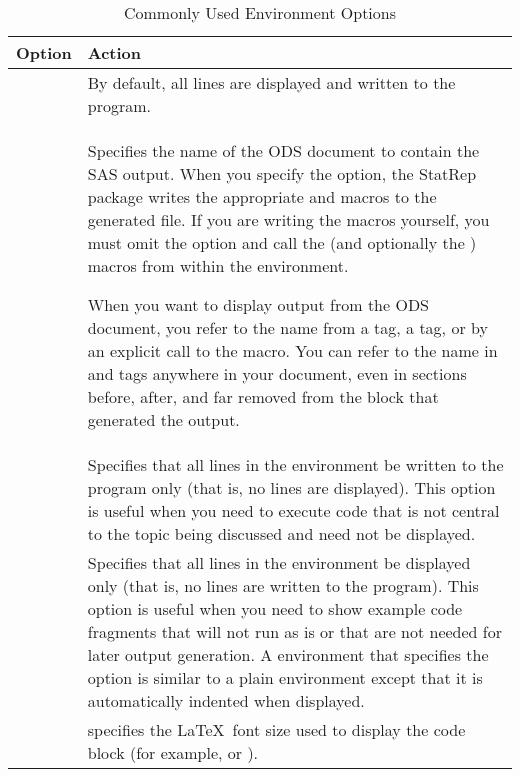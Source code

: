 \documentclass[article,oneside]{memoir}
\newcommand*{\StatRep}{\textsf{StatRep}\xspace}
\begin{document}
\begin{table}[H]
\caption{Commonly Used  Environment Options}\label{scopt}
\begin{tabular}{lP{3.75in}}
\hline
\textbf{Option}  &  \textbf{Action} \\
\hline
& By default, all lines are displayed and written to the program. \\[0.5\baselineskip]
      &
         Specifies the name of the ODS document to contain the SAS output.
         When you specify the  option, the \StatRep package writes the
         appropriate  and  macros to the generated file.
         If you are writing the macros yourself, you must omit the  option
         and call the  (and optionally the ) macros from within the
          environment.

         When you want to display output from the ODS document, you refer
         to the  name from a  tag, a  tag, or by
         an explicit call to the  macro. You can refer to the name in
          and  tags
         anywhere in your document, even in sections before, after, and far removed from
         the  block that generated the output.
\\[0.5\baselineskip]

     & Specifies that  all lines in the environment
                     be written to the program only
                (that is, no lines are displayed). This option is useful when you need
                to execute code that is not central to the topic being discussed and need not
                be displayed.
\\[0.5\baselineskip]
     &
                  Specifies that all lines in the environment
                  be displayed only (that is, no lines are written to the program).
                This option is
                useful when you need to show example code
                fragments that will not run as is or that are not needed
                for later output generation. A  environment that specifies
                the  option is similar to a plain  environment except
                that it is automatically indented when displayed.
\\[0.5\baselineskip]
   &
        specifies the \LaTeX\ font size used to display the
       code block (for example,  or ).
\\
\hline
\end{tabular}
\end{table}
\end{document}
